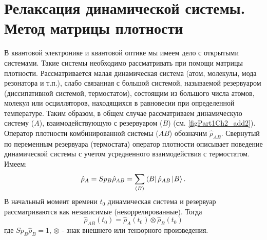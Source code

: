 \section{Релаксация динамической системы. Метод матрицы плотности}
В квантовой электронике и квантовой оптике мы имеем дело с открытыми
системами. Такие системы необходимо рассматривать при помощи
матрицы плотности. Рассматривается малая динамическая система
(атом, молекулы, мода резонатора и т.п.), слабо связанная с
большой системой, называемой резервуаром (диссипативной
системой, термостатом), состоящим из большого числа атомов,
молекул или осцилляторов, находящихся в равновесии при
определенной температуре. Таким образом, в общем случае
рассматриваем динамическую систему ($A$), взаимодействующую с
резервуаром ($B$) (см. \autoref{figPart1Ch2_add2}). Оператор
плотности комбинированной системы ($AB$) обозначим $\hat{\rho}_{AB}$.
Свернутый по переменным резервуара (термостата) оператор плотности
описывает поведение динамической системы с учетом усредненного
взаимодействия с термостатом. Имеем: 
\begin{equation}
\hat{\rho}_{A} = Sp_{B} \hat{\rho}_{AB} = 
\sum_{\left(B\right)}
\bra{B}\hat{\rho}_{AB}\ket{B}.
\end{equation}
В начальный момент времени $t_0$ динамическая система и резервуар
рассматриваются как независимые (некоррелированные). Тогда 
\begin{equation}
\hat{\rho}_{AB}\left(t_0\right) = 
\hat{\rho}_{A}\left(t_0\right)
\otimes
\hat{\rho}_{B}\left(t_0\right)
\end{equation}
где  $Sp_B \hat{\rho}_{B} = 1$, $\otimes$ - знак внешнего или
тензорного произведения.  



